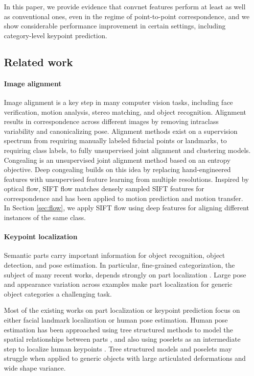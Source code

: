 \documentclass{article} %
\begin{document}
In this paper, we provide evidence that convnet features perform at least as
well as conventional ones, even in the regime of point-to-point correspondence,
and we show considerable performance improvement in certain settings, including
category-level keypoint prediction.

\subsection{Related work}
\paragraph{Image alignment}

Image alignment is a key step in many computer vision tasks, including face
verification, motion analysis, stereo matching, and object recognition.
Alignment results in correspondence across different images by removing
intraclass variability and canonicalizing pose.
Alignment methods exist on a supervision spectrum from requiring
manually labeled fiducial points or landmarks, to requiring class labels, to
fully unsupervised joint alignment and clustering models.
Congealing \cite{congealing} is an unsupervised joint alignment method based on
an entropy objective.
Deep congealing \cite{deep_congealing} builds on this idea by
replacing hand-engineered features with unsupervised feature
learning from multiple resolutions.
Inspired by optical flow, SIFT flow \cite{sift-flow} matches densely sampled
SIFT features for correspondence and has been applied to motion prediction and
motion transfer.
In Section \ref{sec:flow}, we apply SIFT flow using deep features for aligning
different instances of the same class.

\paragraph{Keypoint localization}
Semantic parts carry important information for object recognition, object
detection, and pose estimation. In particular, fine-grained categorization,
the subject of many recent works, depends strongly on part localization
\cite{iccv13_keypoint, poof}.
Large pose and appearance variation across examples make
part localization for generic object categories a challenging task.

Most of the existing works on part localization or keypoint prediction focus on
either facial landmark localization \cite{Belhumeur_Localizing_2011} or human
pose estimation.
Human pose estimation has been approached
using tree structured methods
to model the spatial relationships between parts \cite{YangRamananCVPR11,
Min_Sun_ICCV11, Deva_2012}, and also using poselets
\cite{BourdevMalikICCV09} as an intermediate step to localize human keypoints
\cite{kposelet, armlet}.
Tree structured models and poselets may struggle when applied to generic objects
with large articulated deformations and wide shape variance.
\end{document}
